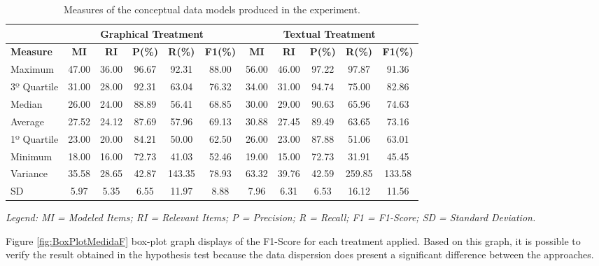 \begin{table}[!htb]
    \caption{Measures of the conceptual data models produced in the experiment.}
    \label{tab:ResultsModelosGeral}
    \centering
    \tiny
    \begin{tabular}{l|ccccc|ccccc}%
    \bottomrule
    \rowcolor[HTML]{C0C0C0}
    \multicolumn{1}{l}{} &
    \multicolumn{5}{c|}{\textbf{Graphical Treatment}} &
    \multicolumn{5}{c}{\textbf{Textual Treatment}}
    \\ 
    \hline
    \rowcolor[HTML]{C0C0C0}
    \textbf{Measure} & \textbf{MI} & \textbf{RI} & \textbf{P(\%)} & \textbf{R(\%)} & \textbf{F1(\%)} &
    \textbf{MI} & \textbf{RI} & \textbf{P(\%)} & \textbf{R(\%)} & \textbf{F1(\%)}
    \\
    \hline
Maximum	&	47.00	&	36.00	&	96.67	&	92.31	&	88.00	&	56.00	&	46.00	&	97.22	&	97.87	&	91.36	\\
3º Quartile	&	31.00	&	28.00	&	92.31	&	63.04	&	76.32	&	34.00	&	31.00	&	94.74	&	75.00	&	82.86	\\
Median	&	26.00	&	24.00	&	88.89	&	56.41	&	68.85	&	30.00	&	29.00	&	90.63	&	65.96	&	74.63	\\
Average	&	27.52	&	24.12	&	87.69	&	57.96	&	69.13	&	30.88	&	27.45	&	89.49	&	63.65	&	73.16	\\
1º Quartile	&	23.00	&	20.00	&	84.21	&	50.00	&	62.50	&	26.00	&	23.00	&	87.88	&	51.06	&	63.01	\\
Minimum	&	18.00	&	16.00	&	72.73	&	41.03	&	52.46	&	19.00	&	15.00	&	72.73	&	31.91	&	45.45	\\
Variance	&	35.58	&	28.65	&	42.87	&	143.35	&	78.93	&	63.32	&	39.76	&	42.59	&	259.85	&	133.58	\\
SD &	5.97	&	5.35	&	6.55	&	11.97	&	8.88	&	7.96	&	6.31	&	6.53	&	16.12	&	11.56	\\
    \toprule
\end{tabular}
\begin{tablenotes}
    \scriptsize
    \centering
    \item \textit{Legend: MI = Modeled Items; RI = Relevant Items; P = Precision; R = Recall; F1 = F1-Score; SD = Standard Deviation.}
\end{tablenotes}
\end{table}

Figure \ref{fig:BoxPlotMedidaF} box-plot graph displays of the F1-Score for each treatment applied. 
Based on this graph, it is possible to verify the result obtained in the hypothesis test because the data dispersion does present a significant difference between the approaches.


